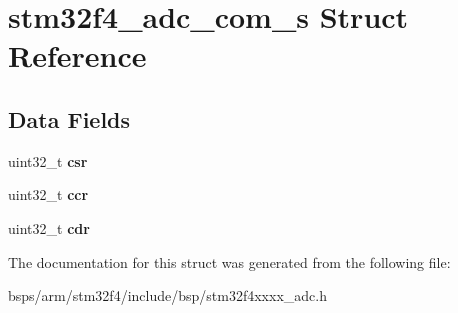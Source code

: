 \hypertarget{structstm32f4__adc__com__s}{}\section{stm32f4\+\_\+adc\+\_\+com\+\_\+s Struct Reference}
\label{structstm32f4__adc__com__s}
\subsection*{Data Fields}
\begin{DoxyCompactItemize}
\item 
\mbox{\label{structstm32f4__adc__com__s_af47c335ef4bc217b9f9dc4165313d766}} 
uint32\+\_\+t {\bfseries csr}
\item 
\mbox{\label{structstm32f4__adc__com__s_a16091bb5338abf259a27d7718632d2ef}} 
uint32\+\_\+t {\bfseries ccr}
\item 
\mbox{\label{structstm32f4__adc__com__s_ae50d5ea6dd998da5364794241ffb9b94}} 
uint32\+\_\+t {\bfseries cdr}
\end{DoxyCompactItemize}


The documentation for this struct was generated from the following file\+:\begin{DoxyCompactItemize}
\item 
bsps/arm/stm32f4/include/bsp/stm32f4xxxx\+\_\+adc.\+h\end{DoxyCompactItemize}
